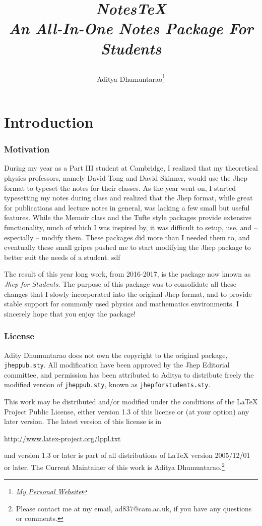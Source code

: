 \documentclass[10pt]{article}
\title{\begin{center}{\Huge \textit{NotesTeX}}\\{{\itshape An All-In-One Notes Package For Students}}\end{center}}
\author{Aditya Dhumuntarao\footnote{\href{https://geodesick.com/}{\textit{My Personal Website}}}}
\affiliation{
DAMTP, University of Cambridge\\
Perimeter Institute of Theoretical Physics\\
University of Minnesota
}
\begin{document}
	\maketitle
	\flushbottom
	\newpage
	\pagestyle{fancyjhepmod}
	\part{Introduction}	
	\section{Motivation}\label{Sec:Motivation}
	During my year as a Part III student at Cambridge, I realized that my theoretical physics professors, namely David Tong and David Skinner, would use the Jhep format to typeset the notes for their classes. As the year went on, I started typesetting my notes during class and realized that the Jhep format, while great for publications and lecture notes in general, was lacking a few small but useful features. While the Memoir class and the Tufte style packages provide extensive functionality, much of which I was inspired by, it was difficult to setup, use, and -- especially -- modify them. These packages did more than I needed them to, and eventually these small gripes pushed me to start modifying the Jhep package to better suit the needs of a student. sdf

	The result of this year long work, from 2016-2017, is the package now known as \textit{Jhep for Students.} The purpose of this package was to consolidate all these changes that I slowly incorporated into the original Jhep format, and to provide stable support for commonly used physics and mathematics environments. I sincerely hope that you enjoy the package!
	
	\section{License}\label{Sec:License}
	Adity Dhumuntarao does not own the copyright to the original package, \texttt{jheppub.sty}. All modification have been approved by the Jhep Editorial committee, and permission has been attributed to Aditya to distribute freely the modified version of \texttt{jheppub.sty}, known as \texttt{jhepforstudents.sty}.

	This work may be distributed and/or modified under the conditions of the LaTeX Project Public License, either version 1.3 of this license or (at your option) any later version. The latest version of this license is in 
	\begin{center}
		\href{http://www.latex-project.org/lppl.txt}{http://www.latex-project.org/lppl.txt}
	\end{center}
	and version 1.3 or later is part of all distributions of LaTeX version 2005/12/01 or later. The Current Maintainer of this work is Aditya Dhumuntarao.\footnote{Please contact me at my email, ad837@cam.ac.uk, if you have any questions or comments.}
\end{document}
